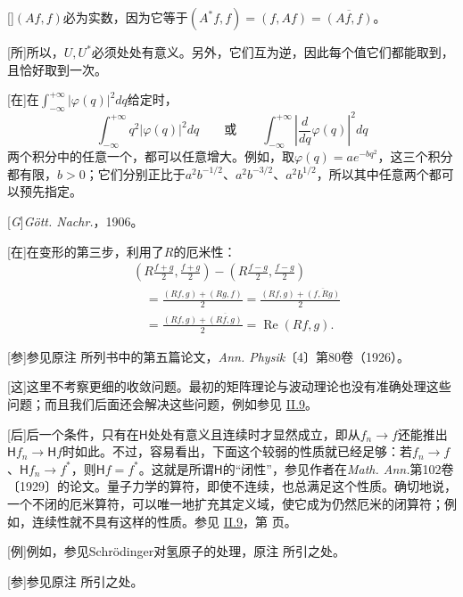 \documentclass[fontsize=13pt,twoside,openany,headings=normal,parskip=false,bookmarkpackage=false,DIV=calc]{scrbook}
\newcommand{\srcpage}[1]{\hyperref[origpage-#1]{\pageref*{origpage-#1}}}
\begin{document}
[]{$(Af,\allowbreak f)$必为实数，因为它等于$(A^*f,\allowbreak f)=(f,\allowbreak Af)=\overline{(Af,\allowbreak f)}$。}

[所]{所以，$U,\allowbreak U^*$必须处处有意义。另外，它们互为逆，因此每个值它们都能取到，且恰好取到一次。}

[在]{在$\int_{-\infty}^{+\infty}|\varphi(q)|^2dq$给定时，
\[
\int_{-\infty}^{+\infty}q^2|\varphi(q)|^2dq
\qquad\text{或}\qquad
\int_{-\infty}^{+\infty}\left|\frac d{dq}\varphi(q)\right|^2dq
\]
两个积分中的任意一个，都可以任意增大。例如，取$\varphi(q)=ae^{-bq^2}$，这三个积分都有限，$b>0$；它们分别正比于$a^2b^{-1/2}$、$a^2b^{-3/2}$、$a^2b^{1/2}$，所以其中任意两个都可以预先指定。}

[\emph{G}]{\emph{Gött. Nachr.}，1906。}

[在]{在变形的第三步，利用了$R$的厄米性：
\begin{align*}
&\left(R\frac{f+g}{2},\frac{f+g}{2}\right)
-\left(R\frac{f-g}{2},\frac{f-g}{2}\right)\\
&\quad=\frac{(Rf,g)+(Rg,f)}2
=\frac{(Rf,g)+\overline{(f,Rg)}}2\\
&\quad=\frac{(Rf,g)+\overline{(Rf,g)}}2
=\operatorname{Re}(Rf,g).
\end{align*}}

[参]{参见原注 \hyperlink{note-9}{} 所列书中的第五篇论文，\emph{Ann. Physik}〔4〕第80卷（1926）。}

[这]{这里不考察更细的收敛问题。最初的矩阵理论与波动理论也没有准确处理这些问题；而且我们后面还会解决这些问题，例如参见 \hyperref[sec:II.9]{II.9}。}

[后]{后一个条件，只有在$\mathsf H$处处有意义且连续时才显然成立，即从$f_n\to f$还能推出$\mathsf Hf_n\to\mathsf Hf$时如此。不过，容易看出，下面这个较弱的性质就已经足够：若$f_n\to f$、$\mathsf Hf_n\to f^*$，则$\mathsf Hf=f^*$。这就是所谓$\mathsf H$的“闭性”，参见作者在\emph{Math. Ann.}第102卷〔1929〕的论文。量子力学的算符，即使不连续，也总满足这个性质。确切地说，一个不闭的厄米算符，可以唯一地扩充其定义域，使它成为仍然厄米的闭算符；例如，连续性就不具有这样的性质。参见 \hyperref[sec:II.9]{II.9}，第 \srcpage{76} 页。}

[例]{例如，参见Schrödinger对氢原子的处理，原注 \hyperlink{note-16}{} 所引之处。}

[参]{参见原注 \hyperlink{note-64}{} 所引之处。}
\end{document}
